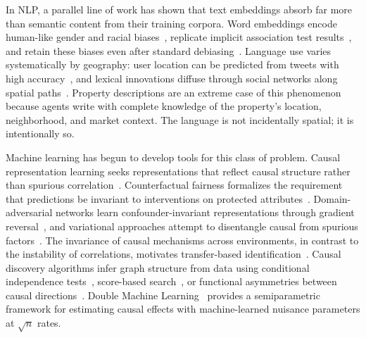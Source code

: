 \documentclass{article}
\begin{document}
In NLP, a parallel line of work has shown that text embeddings absorb far more than semantic content from their training corpora. Word embeddings encode human-like gender and racial biases~\citep{bolukbasi2016man}, replicate implicit association test results~\citep{caliskan2017semantics}, and retain these biases even after standard debiasing~\citep{gonen2019lipstick}. Language use varies systematically by geography: user location can be predicted from tweets with high accuracy~\citep{han2012geolocation}, and lexical innovations diffuse through social networks along spatial paths~\citep{eisenstein2014diffusion}. Property descriptions are an extreme case of this phenomenon because agents write with complete knowledge of the property's location, neighborhood, and market context. The language is not incidentally spatial; it is intentionally so.

Machine learning has begun to develop tools for this class of problem. Causal representation learning seeks representations that reflect causal structure rather than spurious correlation~\citep{scholkopf2021toward,peters2017elements}. Counterfactual fairness formalizes the requirement that predictions be invariant to interventions on protected attributes~\citep{kusner2017counterfactual,kilbertus2017avoiding}. Domain-adversarial networks learn confounder-invariant representations through gradient reversal~\citep{ganin2016domain}, and variational approaches attempt to disentangle causal from spurious factors~\citep{louizos2017causal,moyer2018invariant}. The invariance of causal mechanisms across environments, in contrast to the instability of correlations, motivates transfer-based identification~\citep{rojas2018invariant}. Causal discovery algorithms infer graph structure from data using conditional independence tests~\citep{spirtes2000causation}, score-based search~\citep{chickering2002optimal}, or functional asymmetries between causal directions~\citep{shimizu2006linear,peters2016causal}. Double Machine Learning~\citep{chernozhukov2018double} provides a semiparametric framework for estimating causal effects with machine-learned nuisance parameters at $\sqrt{n}$ rates.
\end{document}

